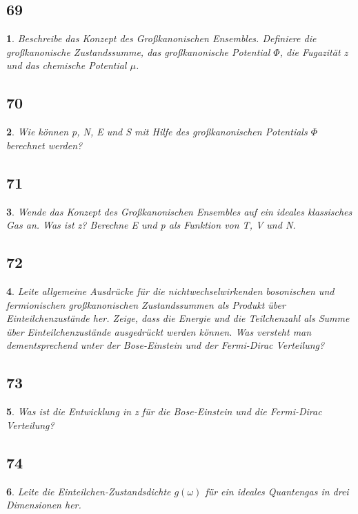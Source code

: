 \documentclass[12pt,a4paper]{report}
\newtheorem{myfrag}{}%
\begin{document}
\subsection{69}
\begin{myfrag}
Beschreibe das Konzept des Großkanonischen Ensembles. Definiere die
großkanonische Zustandssumme, das großkanonische Potential $\Phi$, die
Fugazität z und das chemische Potential $\mu$.
\end{myfrag}
\subsection{70}
\begin{myfrag}
Wie können p, N, E und S mit Hilfe des großkanonischen Potentials $\Phi$
berechnet werden?
\end{myfrag}
\subsection{71}
\begin{myfrag}
Wende das Konzept des Großkanonischen Ensembles auf ein ideales
klassisches Gas an. Was ist z? Berechne E und p als Funktion von T, V und
N.
\end{myfrag}
\subsection{72}
\begin{myfrag}
Leite allgemeine Ausdrücke für die nichtwechselwirkenden bosonischen und
fermionischen großkanonischen Zustandssummen als Produkt über Einteilchenzustände
her. Zeige, dass die Energie und die Teilchenzahl als
Summe über Einteilchenzustände ausgedrückt werden können. Was versteht
man dementsprechend unter der Bose-Einstein und der Fermi-Dirac
Verteilung?
\end{myfrag}
\subsection{73}
\begin{myfrag}
Was ist die Entwicklung in z für die Bose-Einstein und die Fermi-Dirac
Verteilung?
\end{myfrag}
\subsection{74}
\begin{myfrag}
Leite die Einteilchen-Zustandsdichte $g(\omega )$ für ein ideales Quantengas in drei
Dimensionen her.
\end{myfrag}
\end{document}
